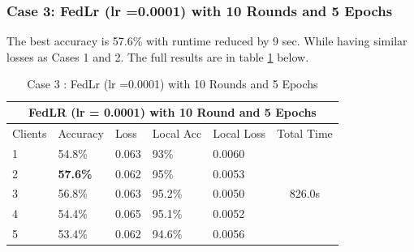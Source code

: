 \documentclass[conference]{IEEEtran}
\begin{document}
 \subsubsection{Case 3: FedLr (lr =0.0001) with 10 Rounds and 5 Epochs}
The best accuracy is 57.6\% with runtime reduced by 9 sec. While having similar losses as Cases 1 and 2. The full results are in table \ref{lrlarge} below.
 \begin{table}[ht]
 	\centering
 	\caption{Case 3 : FedLr (lr =0.0001) with 10 Rounds and 5 Epochs}
 		\begin{tabular}{|lllllc|}
 			\hline
 			\multicolumn{6}{|c|}{FedLR (lr = 0.0001) with 10 Round and 5 Epochs}                                                                                                                            \\ \hline
 			\multicolumn{1}{|l|}{Clients} & \multicolumn{1}{l|}{Accuracy} & \multicolumn{1}{l|}{Loss}  & \multicolumn{1}{l|}{Local Acc} & \multicolumn{1}{l|}{Local Loss} & \multicolumn{1}{l|}{Total Time} \\ \hline
 			\multicolumn{1}{|l|}{1}       & \multicolumn{1}{l|}{54.8\%}   & \multicolumn{1}{l|}{0.063} & \multicolumn{1}{l|}{93\%}      & \multicolumn{1}{l|}{0.0060}     & \multirow{5}{*}{826.0s}         \\ \cline{1-5}
 			\multicolumn{1}{|l|}{2}       & \multicolumn{1}{l|}{\textbf{57.6\%}}   & \multicolumn{1}{l|}{0.062} & \multicolumn{1}{l|}{95\%}      & \multicolumn{1}{l|}{0.0053}     &                                 \\ \cline{1-5}
 			\multicolumn{1}{|l|}{3}       & \multicolumn{1}{l|}{56.8\%}   & \multicolumn{1}{l|}{0.063} & \multicolumn{1}{l|}{95.2\%}    & \multicolumn{1}{l|}{0.0050}     &                                 \\ \cline{1-5}
 			\multicolumn{1}{|l|}{4}       & \multicolumn{1}{l|}{54.4\%}   & \multicolumn{1}{l|}{0.065} & \multicolumn{1}{l|}{95.1\%}    & \multicolumn{1}{l|}{0.0052}     &                                 \\ \cline{1-5}
 			\multicolumn{1}{|l|}{5}       & \multicolumn{1}{l|}{53.4\%}   & \multicolumn{1}{l|}{0.062} & \multicolumn{1}{l|}{94.6\%}    & \multicolumn{1}{l|}{0.0056}     &                                 \\ \hline
 		\end{tabular}%
 		\label{lrlarge}
 \end{table}
\end{document}
